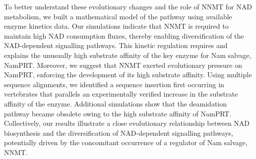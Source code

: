 To better understand these evolutionary changes and the role of NNMT for NAD metabolism, we built a mathematical model of the pathway using available enzyme kinetics data. Our simulations indicate that NNMT is required to maintain high NAD consumption fluxes, thereby enabling diversification of the NAD-dependent signalling pathways. This kinetic regulation requires and explains the unusually high substrate affinity of the key enzyme for Nam salvage, NamPRT. Moreover, we suggest that NNMT exerted evolutionary pressure on NamPRT, enforcing the development of its high substrate affinity. Using multiple sequence alignments, we identified a sequence insertion first occurring in vertebrates that parallels an experimentally verified increase in the substrate affinity of the enzyme. Additional simulations show that the deamidation pathway became obsolete owing to the high substrate affinity of NamPRT. Collectively, our results illustrate a close evolutionary relationship between NAD biosynthesis and the diversification of NAD-dependent signalling pathways, potentially driven by the concomitant occurrence of a regulator of Nam salvage, NNMT.


